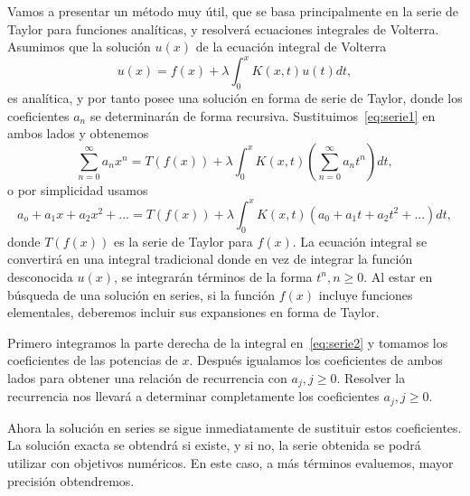 Vamos a presentar un método muy útil, que se basa principalmente en la serie de Taylor para funciones analíticas, y resolverá ecuaciones integrales de Volterra. Asumimos que la solución $u(x)$ de la ecuación integral de Volterra
\begin{equation}
	u(x) = f(x) + \lambda \int_0^x K(x,t)u(t)dt,
\end{equation}
es analítica, y por tanto posee una solución en forma de serie de Taylor, donde los coeficientes $a_n$ se determinarán de forma recursiva. Sustituimos~\eqref{eq:serie1} en ambos lados y obtenemos
\begin{equation}\label{eq:serie2}
	\sum_{n=0}^{\infty}a_nx^n = T(f(x)) + \lambda \int_{0}^{x}K(x,t)(\sum_{n=0}^{\infty}a_nt^n)dt,
\end{equation}
o por simplicidad usamos
\begin{equation}
	a_o + a_1x + a_2x^2 + ... = T(f(x)) + \lambda \int_{0}^{x}K(x,t) (a_0+a_1t+a_2t^2+...)dt,
\end{equation}
donde $T(f(x))$ es la serie de Taylor para $f(x)$. La ecuación integral se convertirá en una integral tradicional donde en vez de integrar la función desconocida $u(x)$, se integrarán términos de la forma $t^n,n\geqslant0$. Al estar en búsqueda de una solución en series, si la función $f(x)$ incluye funciones elementales, deberemos incluir sus expansiones en forma de Taylor.

Primero integramos la parte derecha de la integral en~\eqref{eq:serie2} y tomamos los coeficientes de las potencias de $x$. Después igualamos los coeficientes de ambos lados para obtener una relación de recurrencia con $a_j, j\geqslant0$. Resolver la recurrencia nos llevará a determinar completamente los coeficientes $a_j, j\geqslant0$.

Ahora la solución en series se sigue inmediatamente de sustituir estos coeficientes. La solución exacta se obtendrá si existe, y si no, la serie obtenida se podrá utilizar con objetivos numéricos. En este caso, a más términos evaluemos, mayor precisión obtendremos.

